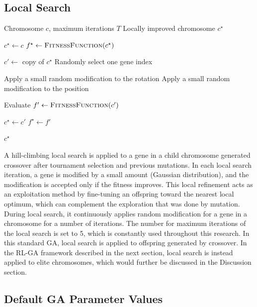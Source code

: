 \documentclass{article}
\begin{document}
\subsection{Local Search}
\begin{algorithm}[H]
\caption{Local Search}
\label{alg:local_search}
\begin{algorithmic}[1]
\Require Chromosome $c$, maximum iterations $T$
\Ensure Locally improved chromosome $c^\star$

\State $c^\star \gets c$
\State $f^\star \gets \Call{FitnessFunction}{c^\star}$

    \State $c' \gets$ copy of $c^\star$
    \State Randomly select one gene index

        \State Apply a small random modification to the rotation
    \Else
        \State Apply a small random modification to the position
    \EndIf

    \State Evaluate $f' \gets \Call{FitnessFunction}{c'}$

        \State $c^\star \gets c'$
        \State $f^\star \gets f'$
    \EndIf
\EndFor

\State \Return $c^\star$
\end{algorithmic}
\end{algorithm}
A hill-climbing local search is applied to a gene in a child chromosome generated crossover after tournament selection and previous mutations. In each local search iteration, a gene is modified by a small amount (Gaussian distribution), and the modification is accepted only if the fitness improves. This local refinement acts as an exploitation method by fine-tuning an offspring toward the nearest local optimum, which can complement the exploration that was done by mutation. During local search, it continuously applies random modification for a gene in a chromosome for a number of iterations. The number for maximum iterations of the local search is set to 5, which is constantly used throughout this research. In this standard GA, local search is applied to offspring generated by crossover. In the RL-GA framework described in the next section, local search is instead applied to elite chromosomes, which would further be discussed in the Discussion section.

\subsection{Default GA Parameter Values}
\end{document}
